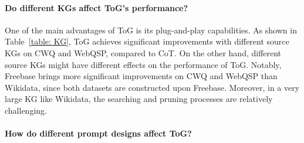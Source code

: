 \documentclass{article} %
\begin{document}
\paragraph{Do different KGs affect ToG's performance?}


One of the main advantages of ToG is its plug-and-play capabilities. As shown in Table~\ref{table: KG}, ToG achieves significant improvements with different source KGs on CWQ and WebQSP, compared to CoT. On the other hand, different source KGs might have different effects on the performance of ToG. Notably, Freebase brings more significant improvements on CWQ and WebQSP than Wikidata, since both datasets are constructed upon Freebase. Moreover, in a very large KG like Wikidata, the searching and pruning processes are relatively challenging.



\paragraph{How do different prompt designs affect ToG?}
\label{sec: prompt_construction}
\begin{table}
\centering

\caption{Performances of ToG using different prompting designs.}
\label{table: prompt}
\end{table}
\end{document}
